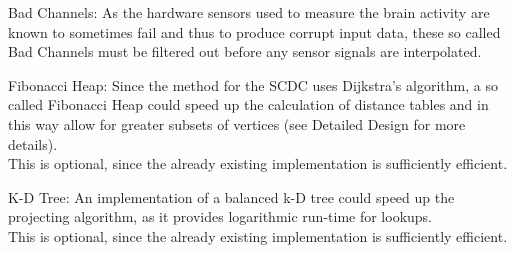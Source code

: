 \begin{aims}
	\item[\hspace*{11mm} Bad Channels:] 
As the hardware sensors used to measure the brain activity are known to sometimes fail and thus to produce corrupt input data, these so called Bad Channels must be filtered out before any sensor signals are interpolated.
\end{aims}

\begin{aims}
	\item[\hspace*{11mm} Fibonacci Heap:] 
Since the method for the SCDC uses Dijkstra's algorithm, a so called Fibonacci Heap could speed up the calculation of distance tables and in this way allow for greater subsets of vertices (see Detailed Design for more details).\\
This is optional, since the already existing implementation is sufficiently efficient.
\end{aims}

\begin{aims}
	\item[\hspace*{11mm} K-D Tree:] 
An implementation of a balanced k-D tree could speed up the projecting algorithm, as it provides logarithmic run-time for lookups.\\
This is optional, since the already existing implementation is sufficiently efficient.
\end{aims}